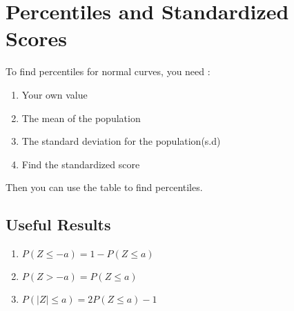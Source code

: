 \documentclass{article}
\begin{document}
\section{Percentiles and Standardized Scores}
To find percentiles for normal curves, you need : 
\begin{enumerate}
\item Your own value 
\item The mean of the population 
\item The standard deviation for the population(s.d)
\item Find the standardized score
\end{enumerate}

Then you can use the table to find percentiles. 

\subsection{Useful Results}
\begin{enumerate}
\item \(P(Z \leq -a) = 1 - P(Z \leq a) \)
\item \(P(Z > -a) = P(Z \leq a)\)
\item \(P(\mid Z \mid \leq a) = 2P(Z \leq a) - 1\)
\end{enumerate}
\end{document}
